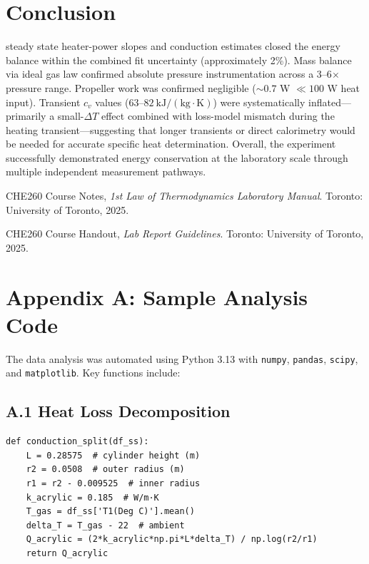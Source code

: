 \documentclass[12pt]{article}
\begin{document}
\section*{Conclusion}
steady state heater-power slopes and conduction estimates closed the energy balance within the combined fit uncertainty (approximately 2\%). Mass balance via ideal gas law confirmed absolute pressure instrumentation across a 3--6$\times$ pressure range. Propeller work was confirmed negligible ($\sim 0.7$ W $\ll 100$ W heat input). Transient $c_v$ values ($63$--$82~\mathrm{kJ/(kg \cdot K)}$) were systematically inflated—primarily a small-$\Delta T$ effect combined with loss-model mismatch during the heating transient—suggesting that longer transients or direct calorimetry would be needed for accurate specific heat determination. Overall, the experiment successfully demonstrated energy conservation at the laboratory scale through multiple independent measurement pathways.

\begin{thebibliography}{9}
CHE260 Course Notes, \textit{1st Law of Thermodynamics Laboratory Manual}. Toronto: University of Toronto, 2025.

CHE260 Course Handout, \textit{Lab Report Guidelines}. Toronto: University of Toronto, 2025.
\end{thebibliography}

\newpage

\appendix

\section*{Appendix A: Sample Analysis Code}

The data analysis was automated using Python 3.13 with \texttt{numpy}, \texttt{pandas}, \texttt{scipy}, and \texttt{matplotlib}. Key functions include:

\subsection*{A.1 Heat Loss Decomposition}

\begin{verbatim}
def conduction_split(df_ss):
    L = 0.28575  # cylinder height (m)
    r2 = 0.0508  # outer radius (m)
    r1 = r2 - 0.009525  # inner radius
    k_acrylic = 0.185  # W/m·K
    T_gas = df_ss['T1(Deg C)'].mean()
    delta_T = T_gas - 22  # ambient
    Q_acrylic = (2*k_acrylic*np.pi*L*delta_T) / np.log(r2/r1)
    return Q_acrylic
\end{verbatim}
\end{document}
